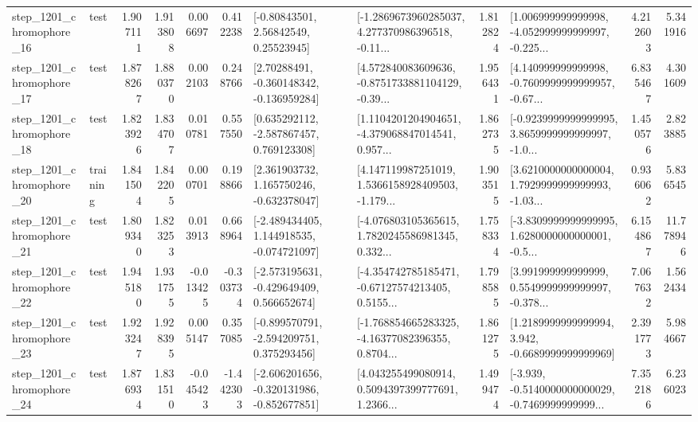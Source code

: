 \begin{tabular}{llrrrrllrlrr}
 step\_1201\_chromophore\_16 &      test &      1.907111 &    1.913808 &      0.006697 &  0.412238 &       [-0.80843501, 2.56842549, 0.25523945] &  [-1.2869673960285037, 4.277370986396518, -0.11... &       1.812824 &  [1.006999999999998, -4.052999999999997, -0.225... &            4.212603 &          5.341916 \\
 step\_1201\_chromophore\_17 &      test &      1.878267 &    1.880370 &      0.002103 &  0.248766 &    [2.70288491, -0.360148342, -0.136959284] &  [4.572840083609636, -0.8751733881104129, -0.39... &       1.956431 &  [4.140999999999998, -0.7609999999999957, -0.67... &            6.835467 &          4.301609 \\
 step\_1201\_chromophore\_18 &      test &      1.823926 &    1.834707 &      0.010781 &  0.557550 &    [0.635292112, -2.587867457, 0.769123308] &  [1.1104201204904651, -4.379068847014541, 0.957... &       1.862735 &  [-0.9239999999999995, 3.8659999999999997, -1.0... &            1.450576 &          2.823885 \\
 step\_1201\_chromophore\_20 &  training &      1.841504 &    1.842205 &      0.000701 &  0.198866 &    [2.361903732, 1.165750246, -0.632378047] &  [4.147119987251019, 1.5366158928409503, -1.179... &       1.903515 &  [3.6210000000000004, 1.7929999999999993, -1.03... &            0.936062 &          5.836545 \\
 step\_1201\_chromophore\_21 &      test &      1.809340 &    1.823253 &      0.013913 &  0.668964 &   [-2.489434405, 1.144918535, -0.074721097] &  [-4.076803105365615, 1.7820245586981345, 0.332... &       1.758334 &  [-3.8309999999999995, 1.6280000000000001, -0.5... &            6.154867 &         11.778946 \\
 step\_1201\_chromophore\_22 &      test &      1.945180 &    1.931755 &     -0.013425 & -0.303734 &   [-2.573195631, -0.429649409, 0.566652674] &  [-4.354742785185471, -0.67127574213405, 0.5155... &       1.798585 &  [3.991999999999999, 0.5549999999999997, -0.378... &            7.067632 &          1.562434 \\
 step\_1201\_chromophore\_23 &      test &      1.923247 &    1.928395 &      0.005147 &  0.357085 &   [-0.899570791, -2.594209751, 0.375293456] &  [-1.768854665283325, -4.16377082396355, 0.8704... &       1.861275 &   [1.2189999999999994, 3.942, -0.6689999999999969] &            2.391773 &          5.984667 \\
 step\_1201\_chromophore\_24 &      test &      1.876934 &    1.831510 &     -0.045423 & -1.442303 &  [-2.606201656, -0.320131986, -0.852677851] &  [4.043255499080914, 0.5094397399777691, 1.2366... &       1.499474 &  [-3.939, -0.5140000000000029, -0.7469999999999... &            7.352186 &          6.236023 \\

\end{tabular}
